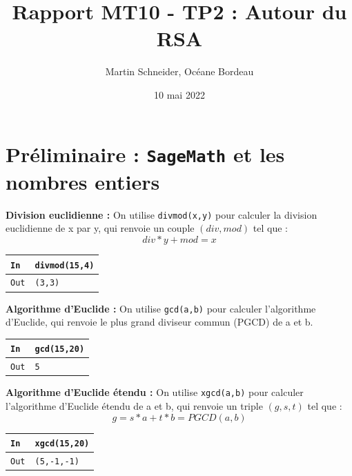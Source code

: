 \documentclass[titlepage]{article}
\title{Rapport MT10 - TP2 : Autour du RSA}
\author{Martin Schneider, Océane Bordeau}
\date{10 mai 2022}
\begin{document}
    \maketitle
    \tableofcontents
    \pagebreak

    \section{Préliminaire : \texttt{SageMath} et les nombres entiers}
    \textbf{Division euclidienne :}
    On utilise \texttt{divmod(x,y)} pour calculer la division euclidienne de x par y, qui renvoie un couple $(div, mod)$ tel que :
    \[div*y + mod = x\]

    \begin{tabularx}{12cm}{|p{0.60cm}|X|}
        \hline
        \rowcolor{gray}
        \texttt{In}
        & 
        \texttt{divmod(15,4)}
        \\
        \hline
        \texttt{Out}
        &
        \texttt{(3,3)}
        \\
        \hline
    \end{tabularx}
    \bigbreak\bigbreak

    \textbf{Algorithme d'Euclide :}
    On utilise \texttt{gcd(a,b)} pour calculer l'algorithme d'Euclide, qui renvoie le plus grand diviseur commun (PGCD) de a et b. \bigbreak

    \begin{tabularx}{12cm}{|p{0.60cm}|X|}
        \hline
        \rowcolor{gray}
        \texttt{In}
        & 
        \texttt{gcd(15,20)}
        \\
        \hline
        \texttt{Out}
        &
        \texttt{5}
        \\
        \hline
    \end{tabularx}
    \bigbreak\bigbreak

    \textbf{Algorithme d'Euclide étendu :}
    On utilise \texttt{xgcd(a,b)} pour calculer l'algorithme d'Euclide étendu de a et b, qui renvoie un triple $(g, s, t)$ tel que :
    \[g = s*a + t*b = PGCD(a,b)\]

    \begin{tabularx}{12cm}{|p{0.60cm}|X|}
        \hline
        \rowcolor{gray}
        \texttt{In}
        & 
        \texttt{xgcd(15,20)}
        \\
        \hline
        \texttt{Out}
        &
        \texttt{(5,-1,-1)}
        \\
        \hline
    \end{tabularx}
    \bigbreak\bigbreak
\end{document}
